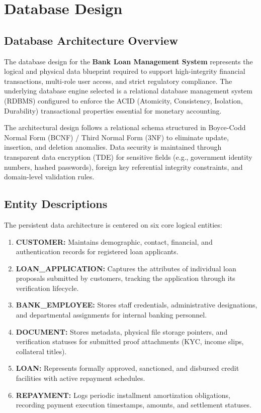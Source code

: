 \chapter{Database Design}

\section{Database Architecture Overview}

The database design for the \textbf{Bank Loan Management System} represents the logical and physical data blueprint required to support high-integrity financial transactions, multi-role user access, and strict regulatory compliance. The underlying database engine selected is a relational database management system (RDBMS) configured to enforce the ACID (Atomicity, Consistency, Isolation, Durability) transactional properties essential for monetary accounting.

The architectural design follows a relational schema structured in Boyce-Codd Normal Form (BCNF) / Third Normal Form (3NF) to eliminate update, insertion, and deletion anomalies. Data security is maintained through transparent data encryption (TDE) for sensitive fields (e.g., government identity numbers, hashed passwords), foreign key referential integrity constraints, and domain-level validation rules.

\section{Entity Descriptions}

The persistent data architecture is centered on six core logical entities:

\begin{enumerate}
  \item \textbf{CUSTOMER:} Maintains demographic, contact, financial, and authentication records for registered loan applicants.
  \item \textbf{LOAN\_APPLICATION:} Captures the attributes of individual loan proposals submitted by customers, tracking the application through its verification lifecycle.
  \item \textbf{BANK\_EMPLOYEE:} Stores staff credentials, administrative designations, and departmental assignments for internal banking personnel.
  \item \textbf{DOCUMENT:} Stores metadata, physical file storage pointers, and verification statuses for submitted proof attachments (KYC, income slips, collateral titles).
  \item \textbf{LOAN:} Represents formally approved, sanctioned, and disbursed credit facilities with active repayment schedules.
  \item \textbf{REPAYMENT:} Logs periodic installment amortization obligations, recording payment execution timestamps, amounts, and settlement statuses.
\end{enumerate}

